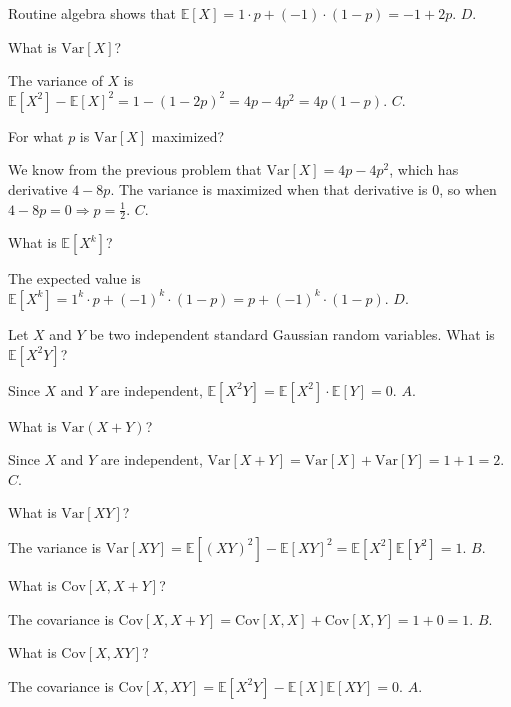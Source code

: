 \documentclass[a4paper]{article}
\begin{document}
\begin{Solution}
	Routine algebra shows that $\mathbb{E}[X] = 1 \cdot p + (-1) \cdot (1 - p) = -1 + 2p.$ $\boxed{D}$.
\end{Solution}
\begin{Exercise}
	What is $\text{Var}[X]$?
\end{Exercise}
\begin{Solution}
	The variance of $X$ is $\mathbb{E}[X^2] - \mathbb{E}[X]^2 = 1 - (1 - 2p)^2 = 4p - 4p^2 = 4p (1 - p).$ $\boxed{C}$.
\end{Solution}
\begin{Exercise}
	For what $p$ is $\text{Var}[X]$ maximized?
\end{Exercise}
\begin{Solution}
	We know from the previous problem that $\text{Var}[X] = 4p - 4p^2$, which has derivative $4 - 8p$. The variance is maximized when that derivative is $0$, so when $4 - 8p = 0 \Longrightarrow p = \frac{1}{2}.$ $\boxed{C}$.
\end{Solution}
\begin{Exercise}
	What is $\mathbb{E}[X^k]$?
\end{Exercise}
\begin{Solution}
	The expected value is $\mathbb{E}[X^k] = 1^k \cdot p + (-1)^k \cdot (1 - p) = p + (-1)^k \cdot (1 - p)$. $\boxed{D}$.
\end{Solution}
\begin{Exercise}
	Let $X$ and $Y$ be two independent standard Gaussian random variables. What is $\mathbb{E}[X^2Y]$?
\end{Exercise}
\begin{Solution}
	Since $X$ and $Y$ are independent, $\mathbb{E}[X^2Y] = \mathbb{E}[X^2] \cdot \mathbb{E}[Y] = 0.$ $\boxed{A}$.
\end{Solution}
\begin{Exercise}
	What is $\text{Var}(X + Y)$?
\end{Exercise}
\begin{Solution}
	Since $X$ and $Y$ are independent, $\text{Var}[X + Y] = \text{Var}[X] + \text{Var}[Y] = 1 + 1 = 2.$ $\boxed{C}$.
\end{Solution}
\begin{Exercise}
	What is $\text{Var}[XY]$?
\end{Exercise}
\begin{Solution}
	The variance is $\text{Var}[XY] = \mathbb{E}[(XY)^2] - \mathbb{E}[XY]^2 = \mathbb{E}[X^2] \mathbb{E}[Y^2] = 1.$ $\boxed{B}$.
\end{Solution}
\begin{Exercise}
	What is $\text{Cov}[X, X + Y]$?
\end{Exercise}
\begin{Solution}
	The covariance is $\text{Cov}[X, X + Y] = \text{Cov}[X, X] + \text{Cov}[X, Y] = 1 + 0 = 1.$ $\boxed{B}$.
\end{Solution}
\begin{Exercise}
	What is $\text{Cov}[X, XY]$?
\end{Exercise}
\begin{Solution}
	The covariance is $\text{Cov}[X, XY] = \mathbb{E}[X^2Y] - \mathbb{E}[X] \mathbb{E}[XY] = 0.$ $\boxed{A}$.
\end{Solution}
\end{document}
